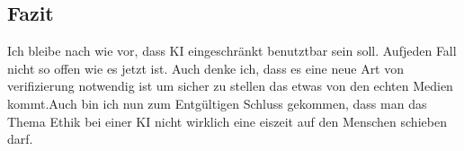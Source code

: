\subsection{Fazit}
Ich bleibe nach wie vor, dass KI eingeschränkt benutztbar sein soll. Aufjeden Fall nicht so offen wie es jetzt ist. Auch denke ich, dass es eine neue Art von verifizierung notwendig ist um sicher zu stellen das etwas von den echten Medien kommt.Auch bin ich nun zum Entgültigen Schluss gekommen, dass man das Thema Ethik bei einer KI nicht wirklich eine eiszeit auf den Menschen schieben darf.

